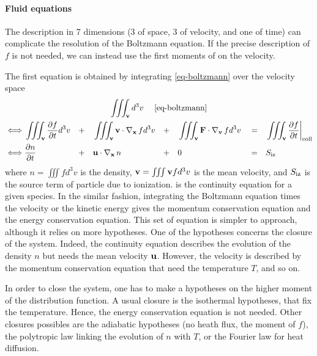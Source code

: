 \paragraph{Fluid equations \\}
The description in 7 dimensions (3 of space, 3 of velocity, and one of time) can complicate the resolution of the Boltzmann equation.
If the precise description of $f$ is not needed, we can instead use the first moments of  on the velocity.

The first equation is obtained by integrating \cref{eq-boltzmann} over the velocity space
\begin{gather}
  \iiint_{\vect{v}} d^3v \quad \text{ \cref{eq-boltzmann}} \\
\begin{align}
   \iff & \iiint_{\vect{v}}  \deriv{f}{t} d^3v &&+&& \iiint_{\vect{v}}  \vect{v} \cdot \grad_{\vect{x}} f  d^3v &&+&&  \iiint_{\vect{v}}  \vect{F} \cdot  \grad_{\vect{v}} f  d^3v && = && \iiint_{\vect{v}}  \deriv{f}{t} \at{\rm coll} \nonumber  \\ 
   \iff &  \deriv{n}{t} &&+&& \vect{u}  \cdot \grad_{\vect{x}} n &&+&& 0 &&=&& S_{\rm iz}   \label{eq-conc}
\end{align} 
\end{gather}
where $n=\iiint f d^3v$ is the density, ${\mathbf v} = \iiint {\mathbf v} f d^3v$ is the mean velocity, and $S_{\rm iz}$ is the source term of particle due to ionization.
 is the continuity equation for a given species.
In the similar fashion, integrating the Boltzmann equation times the velocity or the kinetic energy gives the momentum conservation equation and the energy conservation equation.
This set of equation is simpler to approach, although it relies on more hypotheses.
One of the hypotheses concerns the closure of the system.
Indeed, the continuity equation describes the evolution of the density $n$ but needs the mean velocity ${\mathbf u}$.
However, the velocity is described by the momentum conservation equation that need the temperature $T$, and so on.

In order to close the system, one has to make a hypotheses on the higher moment of the distribution function.
A usual closure is the isothermal hypotheses, that fix the temperature. 
Hence, the energy conservation equation is not needed.
Other closures possibles are the adiabatic hypotheses (no heath flux, the  moment of $f$), the polytropic law linking the evolution of $n$ with $T$, or the Fourier law for heat diffusion.

